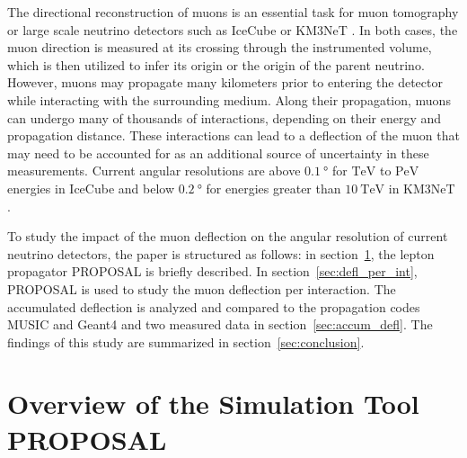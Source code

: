 The directional reconstruction of muons is an essential task for muon tomography or large scale neutrino detectors such as IceCube 
\cite{IceCube_Instrumentation} or KM3NeT \cite{KM3NeT_Design}. In both cases, the muon direction is measured at its crossing through the instrumented volume, which is then utilized to infer its origin or the origin of the parent neutrino. 
However, muons may propagate many kilometers prior to entering the detector while interacting with the surrounding medium. 
Along their propagation, muons can undergo many of thousands 
of interactions, depending on their energy and propagation distance. 
These interactions can lead to a deflection of the muon that may need to be accounted for as an additional source of uncertainty in these measurements. 
Current angular resolutions are above
$\SI{0.1}{\degree}$ for  
$\si{\tera\electronvolt}$ to $\si{\peta\electronvolt}$ energies in IceCube 
\cite{IceCube_Resolution2021} 
and below 
$\SI{0.2}{\degree}$ for energies greater than $\SI{10}{\tera\electronvolt}$ in 
KM3NeT \cite{KM3NeT_Resolution2021}.

To study the impact of the muon deflection on the angular resolution 
of current neutrino detectors, 
the paper is structured as follows: in section~\ref{sec:proposal},
the lepton propagator PROPOSAL is briefly described. In section~\ref{sec:defl_per_int},
PROPOSAL \cite{koehne2013proposal, dunsch_2018_proposal_improvements} is used to study the muon deflection per interaction.
The accumulated deflection is analyzed and compared to the propagation codes
MUSIC \cite{MUSIC} and Geant4 \cite{GEANT4} and two measured data in section~\ref{sec:accum_defl}. The findings of this study
are summarized in section~\ref{sec:conclusion}.

\section{Overview of the Simulation Tool PROPOSAL}\label{sec:proposal}

